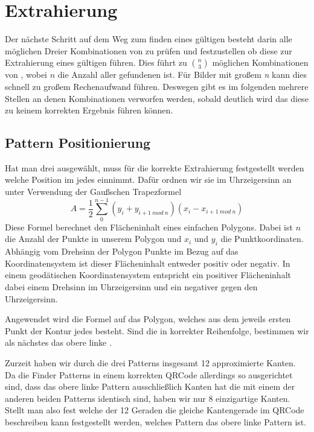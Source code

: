 \chapter{Extrahierung}

Der nächste Schritt auf dem Weg zum finden eines gültigen \QRCodes besteht darin alle möglichen Dreier Kombinationen von \fps zu prüfen und festzustellen ob diese zur Extrahierung eines gültigen \QRCodes führen. Dies führt zu $\binom{n}{3}$ möglichen Kombinationen von \fps, wobei $n$ die Anzahl aller gefundenen \fps ist. Für Bilder mit großem \emph{n} kann dies schnell zu großem Rechenaufwand führen. Deswegen gibt es im folgenden mehrere Stellen an denen Kombinationen verworfen werden, sobald deutlich wird das diese zu keinem korrekten Ergebnis führen können.

\section{Pattern Positionierung} 
Hat man drei \fps ausgewählt, muss für die korrekte Extrahierung festgestellt werden welche Position im \QRCode jedes \fp einnimmt. Dafür ordnen wir sie im Uhrzeigersinn an unter Verwendung der Gaußschen Trapezformel
$$ A=\frac{1}{2} \sum_{0}^{n-1} (y_i + y_{i+1\ mod\ n})(x_i - x_{i+1\ mod\ n}) $$
Diese Formel berechnet den Flächeninhalt eines einfachen Polygons. Dabei ist $n$ die Anzahl der Punkte in unserem Polygon und $x_i$ und $y_i$ die Punktkoordinaten. Abhängig vom Drehsinn der Polygon Punkte im Bezug auf das Koordinatensystem ist dieser Flächeninhalt entweder positiv oder negativ. In einem geodätischen Koordinatensystem entspricht ein positiver Flächeninhalt dabei einem Drehsinn im Uhrzeigersinn und ein negativer gegen den Uhrzeigersinn.

Angewendet wird die Formel auf das Polygon, welches aus dem jeweils ersten Punkt der Kontur jedes \fps besteht. Sind die \fps in korrekter Reihenfolge, bestimmen wir als nächstes das obere linke \fp.

Zurzeit haben wir durch die drei Patterns insgesamt 12 approximierte Kanten. Da die Finder Patterns in einem korrekten QRCode allerdings so ausgerichtet sind, dass das obere linke Pattern ausschließlich Kanten hat die mit einem der anderen beiden Patterns identisch sind, haben wir nur 8 einzigartige Kanten. Stellt man also fest welche der 12 Geraden die gleiche Kantengerade im QRCode beschreiben kann festgestellt werden, welches Pattern das obere linke Pattern ist.

